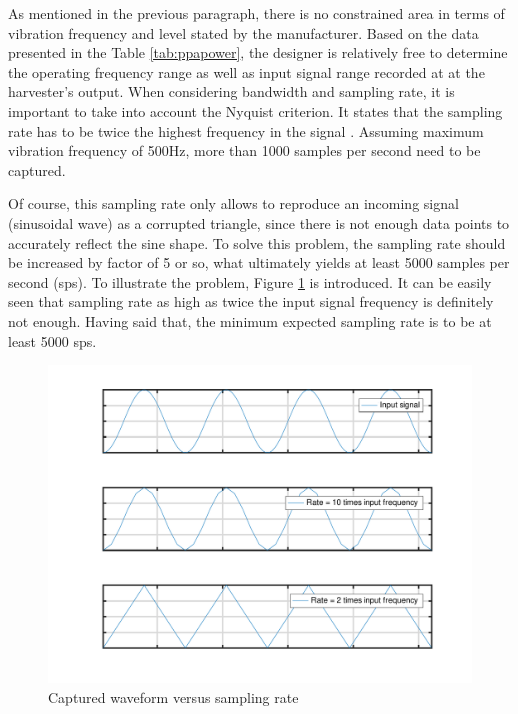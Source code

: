 \documentclass[12pt,a4paper]{article}
\begin{document}
As mentioned in the previous paragraph, there is no constrained area in terms of vibration frequency and level stated by the manufacturer. Based on the data presented in the Table \ref{tab:ppapower}, the designer is relatively free to determine the operating frequency range as well as input signal range recorded at at the harvester's output. When considering bandwidth and sampling rate, it is important to take into account the Nyquist criterion. It states that the sampling rate has to be twice the highest frequency in the signal \cite{ElEx}. Assuming maximum vibration frequency of 500Hz, more than 1000 samples per second need to be captured.
\par

Of course, this sampling rate only allows to reproduce an incoming signal (sinusoidal wave) as a corrupted triangle, since there is not enough data points to accurately reflect the sine shape. To solve this problem, the sampling rate should be increased by factor of 5 or so, what ultimately yields at least 5000 samples per second (sps). To illustrate the problem, Figure \ref{fig:nyquist} is introduced. It can be easily seen that sampling rate as high as twice the input signal frequency is definitely not enough. Having said that, the minimum expected sampling rate is to be at least 5000 sps.
\par

\begin{figure}[h!]
\includegraphics[scale=0.75]{nyquist.pdf}
\caption{Captured waveform versus sampling rate}
\label{fig:nyquist}
\end{figure}
\end{document}
